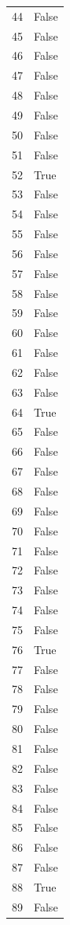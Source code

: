 \documentclass[
  letterpaper,
  DIV=11,
  numbers=noendperiod]{scrreprt}
\begin{document}
\begin{tabular}{ll}
44   &  False \\
45   &  False \\
46   &  False \\
47   &  False \\
48   &  False \\
49   &  False \\
50   &  False \\
51   &  False \\
52   &   True \\
53   &  False \\
54   &  False \\
55   &  False \\
56   &  False \\
57   &  False \\
58   &  False \\
59   &  False \\
60   &  False \\
61   &  False \\
62   &  False \\
63   &  False \\
64   &   True \\
65   &  False \\
66   &  False \\
67   &  False \\
68   &  False \\
69   &  False \\
70   &  False \\
71   &  False \\
72   &  False \\
73   &  False \\
74   &  False \\
75   &  False \\
76   &   True \\
77   &  False \\
78   &  False \\
79   &  False \\
80   &  False \\
81   &  False \\
82   &  False \\
83   &  False \\
84   &  False \\
85   &  False \\
86   &  False \\
87   &  False \\
88   &   True \\
89   &  False \\

\end{tabular}
\end{document}
